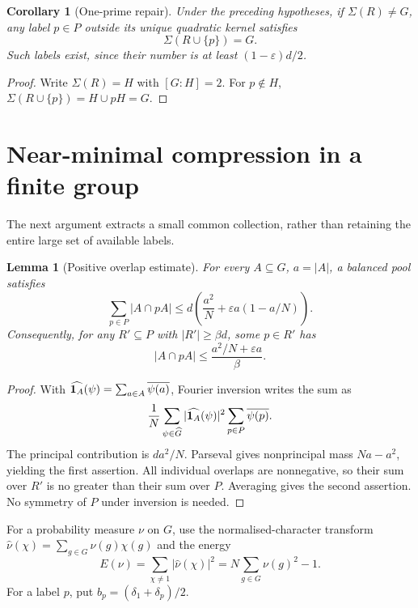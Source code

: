 \documentclass[11pt,a4paper]{article}
\newtheorem{lemma}[theorem]{Lemma}
\newtheorem{corollary}[theorem]{Corollary}
\theoremstyle{definition}
\theoremstyle{remark}
\begin{document}
\begin{corollary}[One-prime repair]
Under the preceding hypotheses, if $\Sigma(R)\ne G$, any label
$p\in P$ outside its unique quadratic kernel satisfies
\[
 \Sigma(R\cup\{p\})=G.
\]
Such labels exist, since their number is at least $(1-\varepsilon)d/2$.
\end{corollary}
\begin{proof}
Write $\Sigma(R)=H$ with $[G:H]=2$. For $p\notin H$,
$\Sigma(R\cup\{p\})=H\cup pH=G$.
\end{proof}




\section{Near-minimal compression in a finite group}\label{p-sec:compression}
The next argument extracts a small common collection, rather than
retaining the entire large set of available labels.

\begin{lemma}[Positive overlap estimate]\label{p-lem:overlap}
For every $A\subseteq G$, $a=|A|$, a balanced pool satisfies
\[
 \sum_{p\in P}|A\cap pA|
 \le d\left(\frac{a^2}{N}+\varepsilon a(1-a/N)\right).
\]
Consequently, for any $R'\subseteq P$ with $|R'|\ge\beta d$, some
$p\in R'$ has
\begin{equation}\label{p-eq:overlap-positive}
 |A\cap pA|\le\frac{a^2/N+\varepsilon a}{\beta}.
\end{equation}
\end{lemma}
\begin{proof}
With $\widehat{\mathbf 1_A}(\psi)=\sum_{a\in A}\overline{\psi(a)}$,
Fourier inversion writes the sum as
\[
 \frac1N\sum_{\psi\in\widehat G}|\widehat{\mathbf 1_A}(\psi)|^2
                   \sum_{p\in P}\overline{\psi(p)}.
\]
The principal contribution is $da^2/N$. Parseval gives nonprincipal
mass $Na-a^2$, yielding the first assertion. All individual overlaps
are nonnegative, so their sum over $R'$ is no greater than their sum
over $P$. Averaging gives the second assertion. No symmetry of $P$
under inversion is needed.
\end{proof}
For a probability measure $\nu$ on $G$, use the normalised-character
transform $\widehat\nu(\chi)=\sum_{g\in G}\nu(g)\chi(g)$ and the energy
\[
 E(\nu)=\sum_{\chi\ne1}|\widehat\nu(\chi)|^2
       =N\sum_{g\in G}\nu(g)^2-1.
\]
For a label $p$, put $b_p=(\delta_1+\delta_p)/2$.
\end{document}
